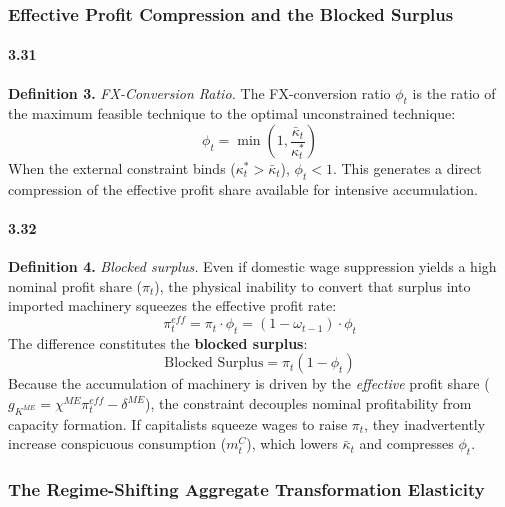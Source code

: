 \subsubsection{Effective Profit Compression and the Blocked
	Surplus}

\paragraph{3.31}
\textbf{Definition 3.} \textit{FX-Conversion Ratio.} The
FX-conversion ratio $\phi_t$ is the ratio of the maximum
feasible technique to the optimal unconstrained technique:
\begin{equation}
	\phi_t = \min\left(1, \frac{\bar{\kappa}_t}{\kappa_t^*}\right)
	\label{eq:33:phi}
\end{equation}
When the external constraint binds ($\kappa_t^* > \bar{\kappa}_t$),
$\phi_t < 1$. This generates a direct compression of the
effective profit share available for intensive accumulation.

\paragraph{3.32}
\textbf{Definition 4.} \textit{Blocked surplus.} Even if
domestic wage suppression yields a high nominal profit share
($\pi_t$), the physical inability to convert that surplus into
imported machinery squeezes the effective profit rate:
\begin{equation}
	\pi_t^{eff} = \pi_t \cdot \phi_t
	= (1 - \omega_{t-1}) \cdot \phi_t
	\label{eq:33:pi_eff}
\end{equation}
The difference constitutes the \textbf{blocked surplus}:
\begin{equation}
	\text{Blocked Surplus} = \pi_t(1 - \phi_t)
	\label{eq:33:blocked}
\end{equation}
Because the accumulation of machinery is driven by the
\textit{effective} profit share
($g_{K^{ME}} = \chi^{ME} \pi_t^{eff} - \delta^{ME}$), the
constraint decouples nominal profitability from capacity
formation. If capitalists squeeze wages to raise $\pi_t$, they
inadvertently increase conspicuous consumption ($m^C_t$),
which lowers $\bar{\kappa}_t$ and compresses $\phi_t$.

\subsubsection{The Regime-Shifting Aggregate
	Transformation Elasticity}

